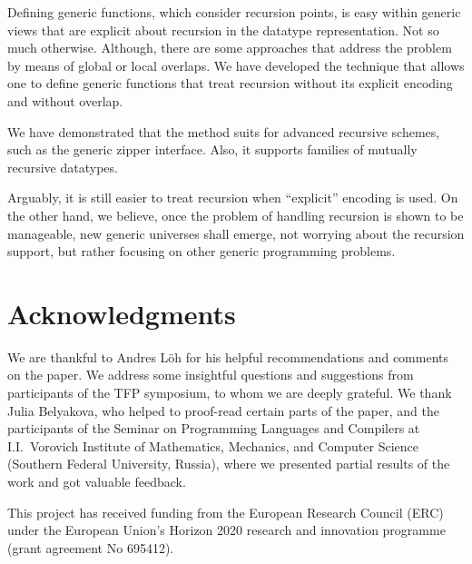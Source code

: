 \documentclass[runningheads]{llncs}
\begin{document}
Defining generic functions, which consider recursion points, is easy within generic views that are explicit about recursion in the datatype representation. Not so much otherwise. Although, there are some approaches that address the problem by means of global or local overlaps. We have developed the technique that allows one to define generic functions that treat recursion without its explicit encoding and without overlap. 

We have demonstrated that the method suits for advanced recursive schemes, such as the generic zipper interface. Also, it supports families of mutually recursive datatypes.

Arguably, it is still easier to treat recursion when ``explicit'' encoding is used. On the other hand, we believe, once the problem of handling recursion is shown to be manageable, new generic universes shall emerge, not worrying about the recursion support, but rather focusing on other generic programming problems.

\section*{Acknowledgments}
\label{sec:acks}

We are thankful to Andres L\"{o}h for his helpful recommendations and comments on the paper. We address some insightful questions and suggestions from participants of the TFP symposium, to whom we are deeply grateful. We thank Julia Belyakova, who helped to proof-read certain parts of the paper, 
and the participants of the Seminar on Programming Languages and Compilers at 
I.I.~Vorovich Institute of Mathematics, Mechanics, and Computer Science (Southern Federal
University, Russia), where we presented partial results of the work and got valuable feedback.

This project has received funding from the European Research Council (ERC) under the
European Union's Horizon 2020 research and innovation programme (grant agreement No 695412).

%
%
%


%
\end{document}
